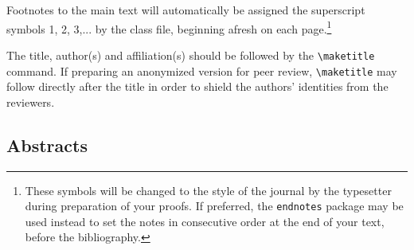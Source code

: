 \documentclass[]{tRSL2e}
\begin{document}
Footnotes to the main text will automatically be assigned the superscript
 symbols 1, 2, 3,... by the class file, beginning afresh on each
page.\footnote{These symbols will be changed to the style of the journal by the
 typesetter during preparation of your proofs. If preferred, the \texttt{endnotes} package
 may be used instead to set the notes in consecutive order at the end
 of your text, before the bibliography.}

The title, author(s) and affiliation(s) should be followed by the {\verb"\maketitle"} command. If preparing an anonymized version for peer review, {\verb"\maketitle"} may follow directly after the title in order to shield the authors' identities from the reviewers.


\subsection{Abstracts}
\end{document}
